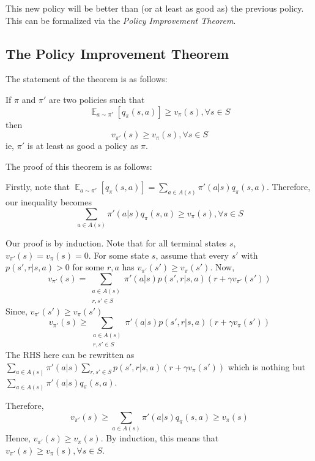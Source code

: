 \documentclass[12pt]{report}
\begin{document}
This new policy will be better than (or at least as good as) the previous policy. This can be formalized via the \textit{Policy Improvement Theorem}.
\subsection{The Policy Improvement Theorem}
The statement of the theorem is as follows:

If $\pi$ and $\pi'$ are two policies such that
\begin{equation}
    \mathop{\mathbb{E}}_{a \sim \pi'}\left[q_{\pi}(s, a)\right] \geq v_{\pi}(s), \forall s \in S
\end{equation}
then
\begin{equation}
    v_{\pi'}(s) \geq v_{\pi}(s), \forall s \in S
\end{equation}
ie, $\pi'$ is at least as good a policy as $\pi$. 

The proof of this theorem is as follows:

Firstly, note that $\mathop{\mathbb{E}}_{a \sim \pi'}\left[q_{\pi}(s, a)\right] = \sum\limits_{a \in A(s)} \pi'(a | s) q_{\pi}(s, a)$. Therefore, our inequality becomes
\begin{equation}
    \sum\limits_{a \in A(s)} \pi'(a | s) q_{\pi}(s, a) \geq v_{\pi}(s), \forall s \in S
\end{equation}

Our proof is by induction. Note that for all terminal states $s$, $v_{\pi'}(s) = v_{\pi}(s) = 0$. For some state $s$, assume that every $s'$ with $p(s', r | s, a) > 0$ for some $r, a$ has $v_{\pi'}(s') \geq v_{\pi}(s')$.
Now,
\begin{equation}
    v_{\pi'}(s) = \sum\limits_{\substack{a \in A(s)\\r, s' \in S}} \pi'(a | s) p(s', r | s, a) (r + \gamma v_{\pi'}(s'))
\end{equation}
Since, $v_{\pi'}(s') \geq v_{\pi}(s')$
\begin{equation}
    v_{\pi'}(s) \geq \sum\limits_{\substack{a \in A(s)\\r, s' \in S}} \pi'(a | s) p(s', r | s, a) (r + \gamma v_{\pi}(s'))
\end{equation}
The RHS here can be rewritten as $\sum\limits_{a \in A(s)} \pi'(a | s) \sum\limits_{r, s' \in S} p(s', r | s, a) (r + \gamma v_{\pi}(s'))$ which is nothing but $\sum\limits_{a \in A(s)} \pi'(a | s) q_{\pi}(s, a)$.

Therefore,
\begin{equation}
    v_{\pi'}(s) \geq \sum\limits_{a \in A(s)} \pi'(a | s) q_{\pi}(s, a) \geq v_{\pi}(s)
\end{equation}
Hence, $v_{\pi'}(s) \geq v_{\pi}(s)$. By induction, this means that $v_{\pi'}(s) \geq v_{\pi}(s), \forall s \in S$.
\end{document}

